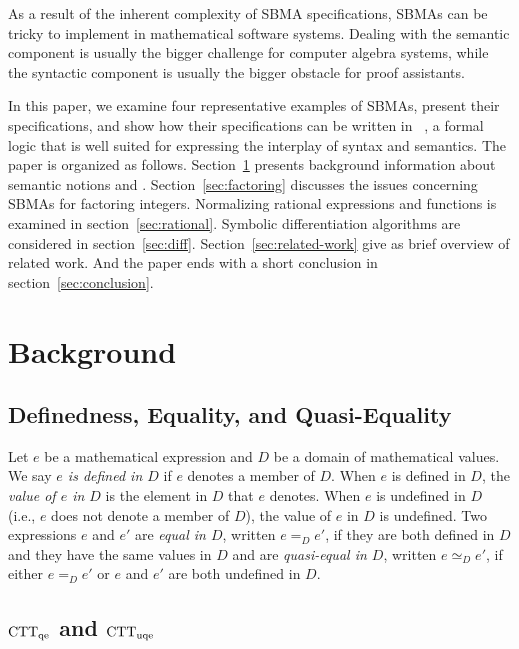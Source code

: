 \documentclass[fleqn]{llncs}
\begin{document}
As a result of the inherent complexity of SBMA specifications, SBMAs
can be tricky to implement in mathematical software systems.  Dealing
with the semantic component is usually the bigger challenge for
computer algebra systems, while the syntactic component is usually the
bigger obstacle for proof assistants.

In this paper, we examine four representative examples of SBMAs,
present their specifications, and show how their specifications can be
written in {\churchuqe}~\cite{Farmer17}, a formal logic that is well
suited for expressing the interplay of syntax and semantics.  The
paper is organized as follows.  Section~\ref{sec:background} presents
background information about semantic notions and {\churchuqe}.
Section~\ref{sec:factoring} discusses the issues concerning SBMAs for
factoring integers. Normalizing rational expressions and functions is
examined in section~\ref{sec:rational}.  Symbolic differentiation
algorithms are considered in section~\ref{sec:diff}.
Section~\ref{sec:related-work} give as brief overview of related work.
And the paper ends with a short conclusion in
section~\ref{sec:conclusion}.


\section{Background}\label{sec:background}

\subsection{Definedness, Equality, and Quasi-Equality}

Let $e$ be a mathematical expression and $D$ be a domain of
mathematical values.  We say \emph{$e$ is defined in $D$} if $e$
denotes a member of $D$.  When $e$ is defined in $D$, the \emph{value
  of $e$ in $D$} is the element in $D$ that $e$ denotes.  When $e$ is
undefined in $D$ (i.e., $e$ does not denote a member of $D$), the
value of $e$ in $D$ is undefined.  Two expressions $e$ and $e'$ are
\emph{equal in $D$}, written $e =_D e'$, if they are both defined in
$D$ and they have the same values in $D$ and are \emph{quasi-equal in
  $D$}, written $e \simeq_D e'$, if either $e =_D e'$ or $e$ and $e'$
are both undefined in $D$.

\subsection{${\rm CTT}_{\rm qe}$ and ${\rm CTT}_{\rm uqe}$}
\end{document}
